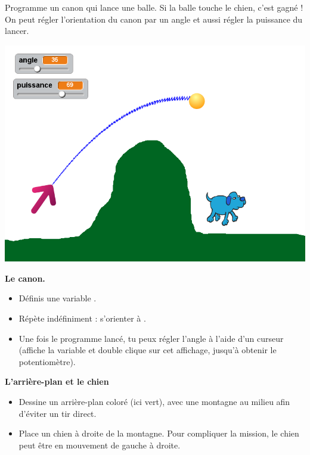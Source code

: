 \documentclass[class=report,crop=false, 12pt]{standalone}
\begin{document}
\begin{activite}

Programme un canon qui lance une balle. Si la balle touche le chien, c'est gagné !
On peut régler l'orientation du canon par un angle et aussi régler la puissance du lancer.

\begin{center}
  \includegraphics[scale=\scaleecran]{ecran-08-ex3} 
\end{center}



\textbf{Le canon.}

\begin{itemize}
  \item Définis une variable .
  \item Répète indéfiniment : s'orienter à .
  \item Une fois le programme lancé, tu peux régler l'angle à l'aide d'un curseur (affiche la variable  et double clique sur cet affichage, jusqu'à obtenir le potentiomètre).
\end{itemize}

\bigskip

\textbf{L'arrière-plan et le chien}
\begin{itemize}
  \item Dessine un arrière-plan coloré (ici vert), avec une montagne au milieu afin d'éviter un tir direct.
  \item Place un chien à droite de la montagne. Pour compliquer la mission, le chien peut être en mouvement de gauche à droite.
\end{itemize}


\end{activite}
\end{document}
